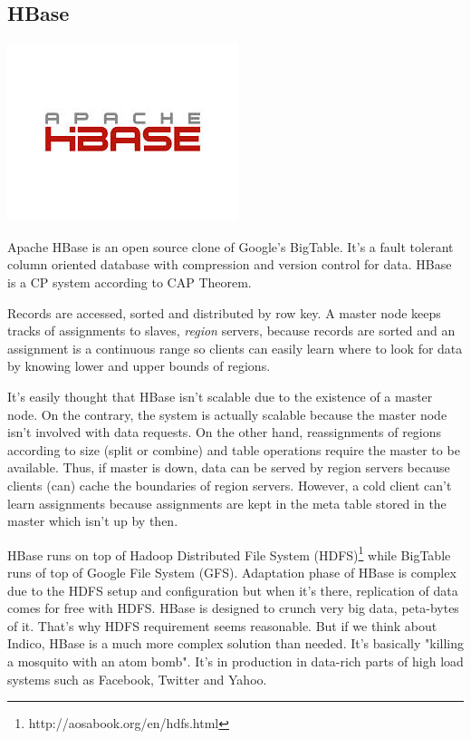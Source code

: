 \vspace{0.5cm}

\subsection{HBase}

\vspace{-1.8cm} \hspace{2.7cm} \includegraphics[scale=0.4]{3/figures/hbase.jpg} \vspace{-0.4cm}

Apache HBase is an open source clone of Google's BigTable\cite{bigtable}. It's a fault tolerant column oriented database with compression and version control for data. HBase is a CP system according to CAP Theorem.

Records are accessed, sorted and distributed by row key. A master node keeps tracks of assignments to slaves, \textit{region} servers, because records are sorted and an assignment is a continuous range so clients can easily learn where to look for data by knowing lower and upper bounds of regions.

It's easily thought that HBase isn't scalable due to the existence of a master node. On the contrary, the system is actually scalable because the master node isn't involved with data requests. On the other hand, reassignments of regions according to size (split or combine) and table operations require the master to be available. Thus, if master is down, data can be served by region servers because clients (can) cache the boundaries of region servers. However, a cold client can't learn assignments because assignments are kept in the meta table stored in the master which isn't up by then.

HBase runs on top of Hadoop Distributed File System (HDFS)\footnote{http://aosabook.org/en/hdfs.html} while BigTable runs of top of Google File System (GFS)\cite{gfs}. Adaptation phase of HBase is complex due to the HDFS setup and configuration but when it's there, replication of data comes for free with HDFS. HBase is designed to crunch very big data, peta-bytes of it. That's why HDFS requirement seems reasonable. But if we think about Indico, HBase is a much more complex solution than needed. It's basically "killing a mosquito with an atom bomb". It's in production in data-rich parts of high load systems such as Facebook, Twitter and Yahoo. 

